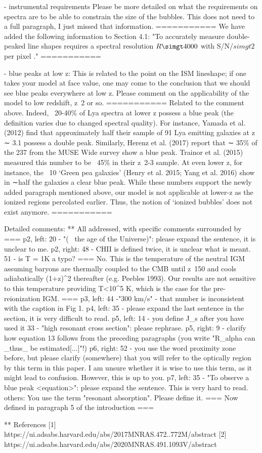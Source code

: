 - instrumental requirements
Please be more detailed on what the requirements on spectra are to be able to constrain the size of the bubbles. This does not need to a full paragraph, I just missed that information.
===========
We have added the following information to Section 4.1: "To accurately measure double-peaked \lya line shapes requires a spectral resolution $R\simgt4000$ with S/N$/simgt2$ per pixel \citep[e.g.,][]{Verhamme2015}."
===========

- blue peaks at low z:
This is related to the point on the ISM lineshape; if one takes your model at face value, one may come to the conclusion that we should see blue peaks everywhere at low z. Please comment on the applicability of the model to low redshift, z~2 or so.
===========
Related to the comment above. Indeed, ~20-40\% of Lya spectra at lower z possess a blue peak (the definition varies due to changed spectral quality). For instance,  Yamada et al. (2012) find that approximately half their sample of 91 Lya emitting galaxies at z ∼ 3.1 possess a double peak.  Similarly, Herenz et al. (2017) report that ∼ 35\% of the 237 from the MUSE Wide survey show a blue peak. Trainor et al. (2015) measured this number to be  ~45\% in their z~2-3 sample.
At even lower z, for instance, the ~10 `Green pea galaxies' (Henry et al. 2015; Yang et al. 2016) show in ∼half the galaxies a clear blue peak.
While these numbers support the newly added paragraph mentioned above, our model is not applicable at lower-z as the ionized regions percolated earlier. Thus, the notion of `ionized bubbles' does not exist anymore.
===========

Detailed comments:
    ** All addressed, with specific comments surrounded by ===
p2, left:
20 - "(~ the age of the Universe)": please expand the sentence, it is unclear to me.
p2, right:
48 - CHII is defined twice, it is unclear what is meant.
51 - is T = 1K a typo?
=== No. This is the temperature of the neutral IGM assuming baryons are thermally coupled to the CMB until z~150 and cools adiabatically (1+z)^2 thereafter (e.g. Peebles 1993). Our results are not sensitive to this temperature providing T<10^5 K, which is the case for the pre-reionization IGM. ===
p3, left:
44 -"300 km/s" - that number is inconsistent with the caption in Fig 1.
p4, left:
35 - please expand the last sentence in the section, it is very difficult to read.
p5, left:
14 - you define J_s after you have used it
33 - "high resonant cross section": please rephrase.
p5, right:
9 - clarify how equation 13 follows from the preceding paragraphs (you write "R_alpha can _thus_ be estimated[...]"!)
p6, right:
52 - you use the word proximity zone before, but please clarify (somewhere) that you will refer to the optically region by this term in this paper. I am unsure whether it is wise to use this term, as it might lead to confusion. However, this is up to you.
p7, left:
35 - "To observe a blue peak <equation>": please expand the sentence. This is very hard to read.
others:
You use the term "resonant absorption". Please define it.
=== Now defined in paragraph 5 of the introduction ===

** References
[1] https://ui.adsabs.harvard.edu/abs/2017MNRAS.472..772M/abstract
[2] https://ui.adsabs.harvard.edu/abs/2020MNRAS.491.1093V/abstract
